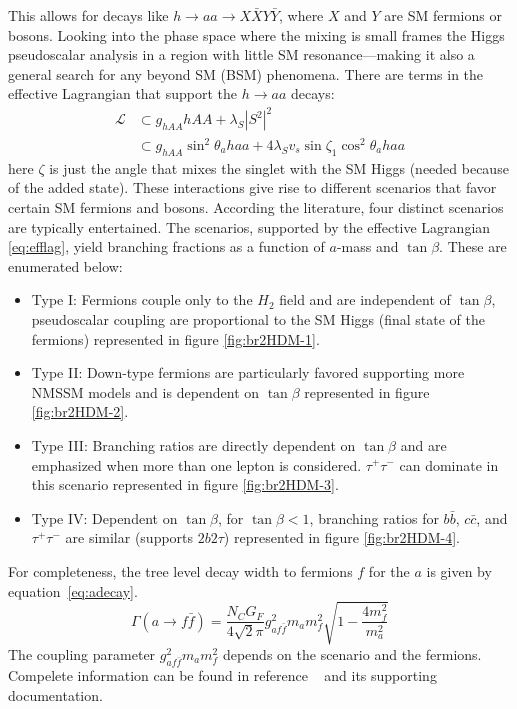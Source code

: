 This allows for decays like $h\rightarrow aa \rightarrow X\bar{X}Y\bar{Y}$, where $X$ and $Y$ are SM fermions or bosons. Looking into the phase space where the mixing is small frames the Higgs pseudoscalar analysis in a region with little SM resonance---making it also a general search for any beyond SM (BSM) phenomena.
There are terms in the effective Lagrangian that support the $h \rightarrow aa $ decays:
\begin{align}
\label{eq:efflag}
\mathcal{L} &\subset g_{hAA}hAA + \lambda_S|S^2|^2  \\
            &\subset g_{hAA}\sin^2\theta_a haa + 4\lambda_S v_s \sin{\zeta_1} \cos^2\theta_a haa \nonumber 
\end{align}
here $\zeta$ is just the angle that mixes the singlet with the SM Higgs (needed because of the added state). These interactions give rise to different scenarios that favor certain SM fermions and bosons. According the literature, four distinct scenarios are typically entertained.  The scenarios, supported by the effective Lagrangian \ref{eq:efflag}, yield branching fractions as a function of $a$-mass and $\tan\beta$.  These are enumerated below:
\begin{itemize}
\item Type I: Fermions couple only to the $H_2$ field and are independent of $\tan\beta$, pseudoscalar coupling are proportional to the SM Higgs (final state of the fermions) represented in figure \ref{fig:br2HDM-1}.
\item Type II: Down-type fermions are particularly favored supporting more NMSSM models and is dependent on $\tan\beta$ represented in figure \ref{fig:br2HDM-2}. 
\item Type III: Branching ratios are directly dependent on $\tan\beta$ and are emphasized when more than one lepton is considered. $\tau^+ \tau^-$ can dominate in this scenario represented in figure \ref{fig:br2HDM-3}. 
\item Type IV: Dependent on $\tan\beta$, for $\tan \beta < 1 $, branching ratios for $b\bar{b}$, $c\bar{c}$, and $\tau^+ \tau^-$ are similar (supports $2b2\tau$) represented in figure \ref{fig:br2HDM-4}.
\end{itemize}

For completeness, the tree level decay width to fermions $f$ for the $a$ is given by equation~\ref{eq:adecay}.
\begin{equation}
\label{eq:adecay}
\Gamma(a \rightarrow f \bar{f}) = \frac{N_C G_F}{4\sqrt{2}\pi} g^2_{a f\bar{f}} m_a m_f^2 \sqrt{1 - \frac{4m^2_f}{m^2_a}}
\end{equation}
The coupling parameter $g^2_{a f\bar{f}} m_a m_f^2$ depends on the scenario and the fermions. Compelete information can be found in reference ~\cite{Branco_2012} and its supporting documentation.


